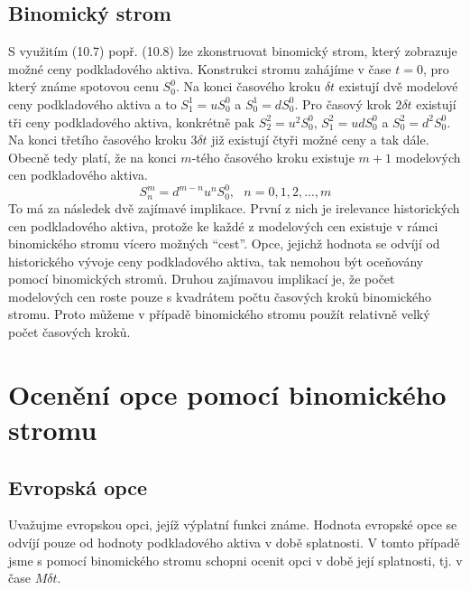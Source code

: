 \documentclass[a4paper]{book}
\begin{document}
\subsection{Binomický strom}

S využitím (10.7) popř. (10.8) lze zkonstruovat binomický strom, který zobrazuje možné ceny podkladového aktiva. Konstrukci stromu zahájíme v čase $t=0$, pro který známe spotovou cenu $S_0^0$. Na konci časového kroku $\delta t$ existují dvě modelové ceny podkladového aktiva a to $S_1^1 = uS_0^0$ a $S_0^1 = dS_0^0$. Pro časový krok $2 \delta t$ existují tři ceny podkladového aktiva, konkrétně pak $S_2^2 = u^2S_0^0$, $S_1^2 = udS_0^0$ a $S_0^2 = d^2S_0^0$. Na konci třetího časového kroku $3 \delta t$ již existují čtyři možné ceny a tak dále. Obecně tedy platí, že na konci $m$-tého časového kroku existuje $m+1$ modelových cen podkladového aktiva.
\begin{equation*}
S_n^m = d^{m-n}u^nS_0^0, ~~~ n = 0, 1, 2,..., m 
\end{equation*}
To má za následek dvě zajímavé implikace. První z nich je irelevance historických cen podkladového aktiva, protože ke každé z modelových cen existuje v rámci binomického stromu vícero možných ``cest''. Opce, jejichž hodnota se odvíjí od historického vývoje ceny podkladového aktiva, tak nemohou být oceňovány pomocí binomických stromů. Druhou zajímavou implikací je, že počet modelových cen roste pouze s kvadrátem počtu časových kroků binomického stromu. Proto můžeme v případě binomického stromu použít relativně velký počet časových kroků. 

\section{Ocenění opce pomocí binomického stromu}

\subsection{Evropská opce}

Uvažujme evropskou opci, jejíž výplatní funkci známe. Hodnota evropské opce se odvíjí pouze od hodnoty podkladového aktiva v době splatnosti. V tomto případě jsme s pomocí binomického stromu schopni ocenit opci v době její splatnosti, tj. v čase $M \delta t$.
\end{document}
